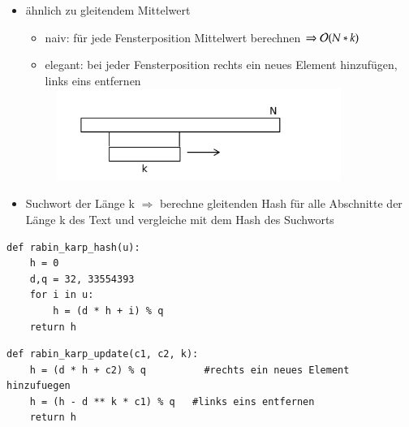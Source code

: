 \begin{itemize}
    \item ähnlich zu gleitendem Mittelwert
    \begin{itemize}
        \item naiv: für jede Fensterposition Mittelwert berechnen $\Rightarrow \mathcal{O}{}(N*k)$
        \item elegant: bei jeder Fensterposition rechts ein neues Element hinzufügen, links eins entfernen\\
        \includegraphics[width=10cm,height=3cm,keepaspectratio]{./Pictures/schiebeArray.png}\\
    \end{itemize}
    \item Suchwort der Länge k $\Rightarrow$ berechne gleitenden Hash für alle Abschnitte der Länge k des Text und vergleiche mit dem Hash des Suchworts
\end{itemize}
\begin{verbatim}
def rabin_karp_hash(u):
    h = 0
    d,q = 32, 33554393
    for i in u:
        h = (d * h + i) % q
    return h
\end{verbatim}

\begin{verbatim}
def rabin_karp_update(c1, c2, k):
    h = (d * h + c2) % q          #rechts ein neues Element hinzufuegen
    h = (h - d ** k * c1) % q   #links eins entfernen
    return h
\end{verbatim}
